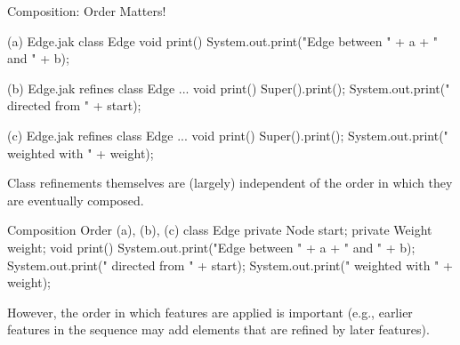 \begin{frame}[fragile]{Composition: Order Matters!}
	\small
	\begin{fancycolumns}[animation=none]
\begin{codetight}[style=footnotesize]{(a) Edge.jak}
class Edge {
	void print() {
		System.out.print("Edge between " + a + " and " + b);
	}
}
\end{codetight}
\begin{codetight}[style=footnotesize]{(b) Edge.jak}
refines class Edge { ...
	void print() {
		Super().print();
		System.out.print(" directed from " + start);
	}
}
\end{codetight}
\begin{codetight}[style=footnotesize]{(c) Edge.jak}
refines class Edge { ...
	void print() {
		Super().print();
		System.out.print(" weighted with " + weight);
	}
}
\end{codetight}
	\nextcolumn
		\begin{note}{}
			Class refinements themselves are (largely) independent of the order in which they are eventually composed.
		\end{note}
\begin{codetight}[style=footnotesize]{Composition Order (a), (b), (c)}
class Edge {
	private Node start;
	private Weight weight;
	void print() {
		System.out.print("Edge between " + a + " and " + b);
		System.out.print(" directed from " + start);
		System.out.print(" weighted with " + weight);
	}
}
\end{codetight}
		\begin{note}{}
			However, the order in which features are applied is important 
			(e.g., earlier features in the sequence may add elements that are refined by later features). 
		\end{note}
	\end{fancycolumns}
\end{frame}

